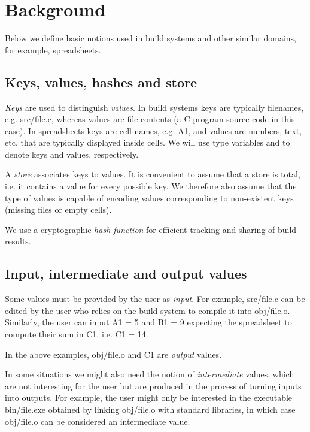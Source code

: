 \clearpage

\section{Background}\label{sec-background}

Below we define basic notions used in build systems and other similar domains,
for example, spreadsheets.

\subsection{Keys, values, hashes and store}

\emph{Keys} are used to distinguish \emph{values}. In build systems keys are
typically filenames, e.g. \textsf{src/file.c}, whereas values are file contents
(a C program source code in this case). In spreadsheets keys are cell names,
e.g. \textsf{A1}, and values are numbers, text, etc. that are typically displayed
inside cells. We will use type variables  and  to denote keys and
values, respectively.

A \emph{store} associates keys to values. It is convenient to assume that a store
is total, i.e. it contains a value for every possible key. We therefore also
assume that the type of values is capable of encoding values corresponding to
non-existent keys (missing files or empty cells).

We use a cryptographic \emph{hash function}  for
efficient tracking and sharing of build results.

\subsection{Input, intermediate and output values}

Some values must be provided by the user as \emph{input}. For example,
\textsf{src/file.c} can be edited by the user who relies on the build system to
compile it into \textsf{obj/file.o}. Similarly, the user can input \textsf{A1 = 5}
and \textsf{B1 = 9} expecting the spreadsheet to compute their sum in \textsf{C1},
i.e. \textsf{C1 = 14}.

In the above examples, \textsf{obj/file.o} and \textsf{C1} are \emph{output} values.

In some situations we might also need the notion of \emph{intermediate} values,
which are not interesting for the user but are produced in the process of turning
inputs into outputs. For example, the user might only be interested in the
executable \textsf{bin/file.exe} obtained by linking \textsf{obj/file.o} with
standard libraries, in which case \textsf{obj/file.o} can be considered an
intermediate value.

